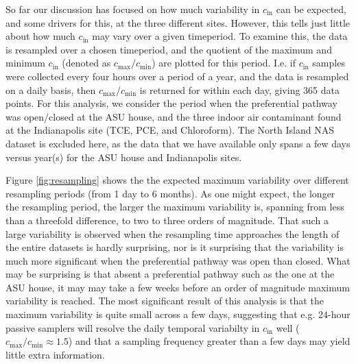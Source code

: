 \documentclass[journal=esthag,manuscript=article]{achemso}
\begin{document}
So far our discussion has focused on how much variability in $c_\mathrm{in}$ can be expected, and some drivers for this, at the three different sites.
However, this tells just little about how much $c_\mathrm{in}$ may vary over a given timeperiod.
To examine this, the data is resampled over a chosen timeperiod, and the quotient of the maximum and minimum $c_\mathrm{in}$ (denoted as $c_\mathrm{max}/c_\mathrm{min}$) are plotted for this period.
I.e. if $c_\mathrm{in}$ samples were collected every four hours over a period of a year, and the data is resampled on a daily basis, then $c_\mathrm{max}/c_\mathrm{min}$ is returned for within each day, giving 365 data points.
For this analysis, we consider the period when the preferential pathway was open/closed at the ASU house, and the three indoor air contaminant found at the Indianapolis site (TCE, PCE, and Chloroform).
The North Island NAS dataset is excluded here, as the data that we have available only spans a few days versus year(s) for the ASU house and Indianapolis sites.

Figure \ref{fig:resampling} shows the the expected maximum variability over different resampling periods (from 1 day to 6 months).
As one might expect, the longer the resampling period, the larger the maximum variability is, spanning from less than a threefold difference, to two to three orders of magnitude.
That such a large variability is observed when the resampling time approaches the length of the entire datasets is hardly surprising, nor is it surprising that the variability is much more significant when the preferential pathway was open than closed.
What may be surprising is that absent a preferential pathway such as the one at the ASU house, it may may take a few weeks before an order of magnitude maximum variability is reached.
The most significant result of this analysis is that the maximum variability is quite small across a few days, suggesting that e.g. 24-hour passive samplers will resolve the daily temporal variabilty in $c_\mathrm{in}$ well ($c_\mathrm{max}/c_\mathrm{min} \approx 1.5$) and that a sampling frequency greater than a few days may yield little extra information.


\end{document}
